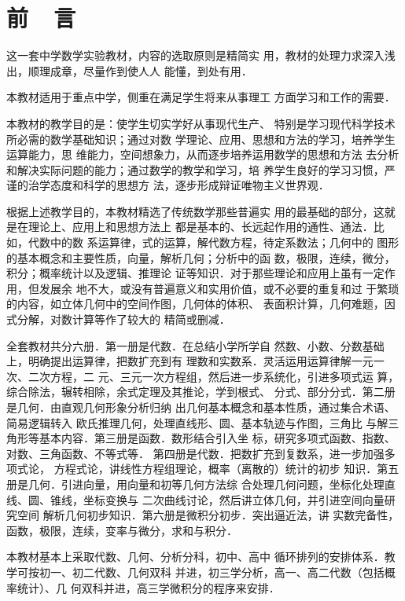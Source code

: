 \chapter{前~~言}

这一套中学数学实验教材，内容的选取原则是精简实
用，教材的处理力求深入浅出，顺理成章，尽量作到使人人
能懂，到处有用．

    本教材适用于重点中学，侧重在满足学生将来从事理工
方面学习和工作的需要．

    本教材的教学目的是：使学生切实学好从事现代生产、
特别是学习现代科学技术所必需的数学基础知识；通过对数
学理论、应用、思想和方法的学习，培养学生运算能力，思
维能力，空间想象力，从而逐步培养运用数学的思想和方法
去分析和解决实际问题的能力；通过数学的教学和学习，培
养学生良好的学习习惯，严谨的治学态度和科学的思想方
法，逐步形成辩证唯物主义世界观．

   根据上述教学目的，本教材精选了传统数学那些普遍实
用的最基础的部分，这就是在理论上、应用上和思想方法上
都是基本的、长远起作用的通性、通法．比如，代数中的数
系运算律，式的运算，解代数方程，待定系数法；几何中的
图形的基本概念和主要性质，向量，解析几何；分析中的函
数，极限，连续，微分，积分；概率统计以及逻辑、推理论
证等知识．对于那些理论和应用上虽有一定作用，但发展余
地不大，或没有普遍意义和实用价值，或不必要的重复和过
于繁琐的内容，如立体几何中的空间作图，几何体的体积、
表面积计算，几何难题，因式分解，对数计算等作了较大的
精简或删减．

    全套教材共分六册．第一册是代数．在总结小学所学自
然数、小数、分数基础上，明确提出运算律，把数扩充到有
理数和实数系．灵活运用运算律解一元一次、二次方程，二
元、三元一次方程组，然后进一步系统化，引进多项式运
算，综合除法，辗转相除，余式定理及其推论，学到根式、
分式、部分分式．第二册是几何．由直观几何形象分析归纳
出几何基本概念和基本性质，通过集合术语、简易逻辑转入
欧氏推理几何，处理直线形、圆、基本轨迹与作图，三角比
与解三角形等基本内容．第三册是函数．数形结合引入坐
标，研究多项式函数、指数、对数、三角函数、不等式等．
第四册是代数．把数扩充到复数系，进一步加强多项式论，
方程式论，讲线性方程组理论，概率（离散的）统计的初步
知识．第五册是几何．引进向量，用向量和初等几何方法综
合处理几何问题，坐标化处理直线、圆、锥线，坐标变换与
二次曲线讨论，然后讲立体几何，并引进空间向量研究空间
解析几何初步知识．第六册是微积分初步．突出逼近法，讲
实数完备性，函数，极限，连续，变率与微分，求和与积分．

本教材基本上采取代数、几何、分析分科，初中、高中
循环排列的安排体系．教学可按初一、初二代数、几何双科
并进，初三学分析，高一、高二代数（包括概率统计）、几
何双科并进，高三学微积分的程序来安排．

